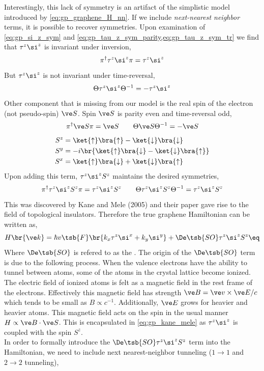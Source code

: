 \documentclass{article}
\begin{document}
Interestingly, this lack of symmetry is an artifact of the simplistic model introduced by \cref{eq:gp_graphene_H_nn}. If we include \textit{next-nearest neighbor} terms, it is possible to recover symmetries. Upon examination of \cref{eq:gp_si_z_sym} and \cref{eq:gp_tau_z_sym_parity,eq:gp_tau_z_sym_tr} we find that $\tau^{z} \si^{z}$ is invariant under inversion,
\[ \pi^{\dagger} \tau^{z} \si^{z} \pi = \tau^{z} \si^{z} \]
But $\tau^{z} \si^{z}$ is not invariant under time-reversal,
\[ \Theta \tau^{z} \si^{z} \Theta^{-1} = -\tau^{z} \si^{z} \]
Other component that is missing from our model is the real spin of the electron (not pseudo-spin) $\ve S$. Spin $\ve S$ is parity even and time-reversal odd,
\[ \pi^{\dagger} \ve S \pi = \ve S \qquad \Theta \ve S \Theta^{-1} = - \ve S \]
\begin{align*}
    S^{z} &= \ket{\uparrow} \bra{\uparrow} - \ket{\downarrow}\bra{\downarrow} \\
    S^{y} &= -i\br{\ket{\uparrow} \bra{\downarrow} - \ket{\downarrow}\bra{\uparrow}} \\
    S^{x} &= \ket{\uparrow} \bra{\downarrow} + \ket{\downarrow}\bra{\uparrow}
\end{align*}
Upon adding this term, $\tau^{z} \si^{z} S^{z}$ maintains the desired symmetries,
\[ \pi^{\dagger} \tau^{z} \si^{z} S^{z} \pi = \tau^{z} \si^{z} S^{z} \qquad \Theta \tau^{z} \si^{z} S^{z} \Theta^{-1} = \tau^{z} \si^{z} S^{z} \]
This was discovered by Kane and Mele (2005) and their paper gave rise to the field of topological insulators. Therefore the true graphene Hamiltonian can be written as,
\[ H\br{\ve k} =\hbar v\tsb{F} \br{k_x \tau^{z} \si^x + k_y \si^{y}} + \De\tsb{SO} \tau^{z} \si^{z} S^{z} \eq \label{eq:gp_kane_mele}\]
Where $\De\tsb{SO}$ is refered to as the . The origin of the $\De\tsb{SO}$ term is due to the following process. When the valence electrons have the ability to tunnel between atoms, some of the atoms in the crystal lattice become ionized. The electric field of ionized atoms is felt as a magnetic field in the rest frame of the electrons. Effectively this magnetic field has strength $\ve B = \ve v \times \ve E / c$ which tends to be small as $B \propto c^{-1}$. Additionally, $\ve E$ grows for heavier and heavier atoms. This magnetic field acts on the spin in the usual manner $H \propto \ve B \cdot \ve S$. This is encapsulated in \cref{eq:gp_kane_mele} as $\tau^{z} \si^{z}$ is coupled with the spin $S^{z}$. \\

In order to formally introduce the $\De\tsb{SO} \tau^{z} \si^{z} S^{z}$ term into the Hamiltonian, we need to include next nearest-neighbor tunneling ($1 \to 1$ and $2 \to 2$ tunneling),
\end{document}
